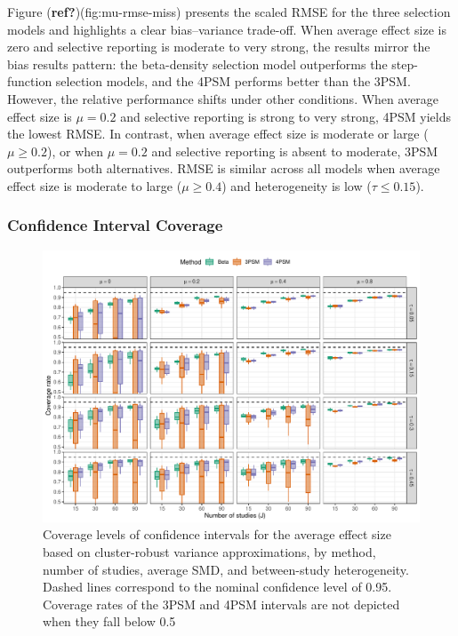 \documentclass[
  american,
  man, donotrepeattitle,floatsintext]{apa7}
\begin{document}
Figure (\textbf{ref?})(fig:mu-rmse-miss) presents the scaled RMSE for the three selection models and highlights a clear bias--variance trade-off. When average effect size is zero and selective reporting is moderate to very strong, the results mirror the bias results pattern: the beta-density selection model outperforms the step-function selection models, and the 4PSM performs better than the 3PSM. However, the relative performance shifts under other conditions. When average effect size is \(\mu = 0.2\) and selective reporting is strong to very strong, 4PSM yields the lowest RMSE. In contrast, when average effect size is moderate or large (\(\mu \geq 0.2\)), or when \(\mu = 0.2\) and selective reporting is absent to moderate, 3PSM outperforms both alternatives. RMSE is similar across all models when average effect size is moderate to large (\(\mu \geq 0.4\)) and heterogeneity is low (\(\tau \leq 0.15\)).

\subsubsection{Confidence Interval Coverage}\label{confidence-interval-coverage-1}

\begin{figure}
\includegraphics{beta-function-selection-models-with-dependent-effects_files/figure-latex/comparison-coverage-miss-1} \caption{Coverage levels of confidence intervals for the average effect size based on cluster-robust variance approximations, by method, number of studies, average SMD, and between-study heterogeneity. Dashed lines correspond to the nominal confidence level of 0.95. Coverage rates of the 3PSM and 4PSM intervals are not depicted when they fall below 0.5}\label{fig:comparison-coverage-miss}
\end{figure}
\end{document}

